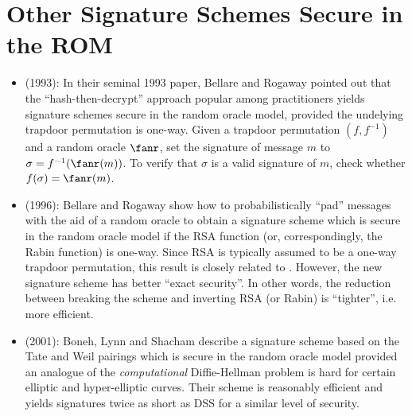 \chapter{Other Signature Schemes Secure in the ROM}
\label{signatures}

\begin{itemize}

\item \cite{bellare:rompractical} (1993): In their seminal 1993 paper, Bellare
and Rogaway pointed out that the ``hash-then-decrypt'' approach popular among
practitioners yields signature schemes secure in the random oracle model,
provided the undelying trapdoor permutation is one-way. Given a trapdoor
permutation $(f,f^{-1})$ and a random oracle $\fanr$, set the signature
of message $m$ to $\sigma = f^{-1}(\fanr(m))$. To verify that $\sigma$ is
a valid signature of $m$, check whether $f(\sigma) = \fanr(m)$.

\item \cite{bellare:signrsa} (1996): Bellare and Rogaway show how to
probabilistically ``pad'' messages with the aid of a random oracle to obtain a 
signature scheme which is secure in the random oracle model if the RSA
function (or, correspondingly, the Rabin function) is one-way. Since RSA is
typically assumed to be a one-way trapdoor permutation, this result is closely
related to \cite{bellare:rompractical}. However, the new signature scheme
has better ``exact security''. In other words, the reduction between breaking 
the scheme and inverting RSA (or Rabin) is ``tighter'', i.e. more
efficient.

\item \cite{boneh:shortsigs} (2001): Boneh, Lynn and Shacham describe a
signature scheme based on the Tate and Weil pairings which is secure in the random
oracle model provided an analogue of the \emph{computational} Diffie-Hellman
problem is hard for certain elliptic and hyper-elliptic curves. Their scheme is reasonably efficient and
yields signatures twice as short as DSS for a similar level of security.

\end{itemize}
